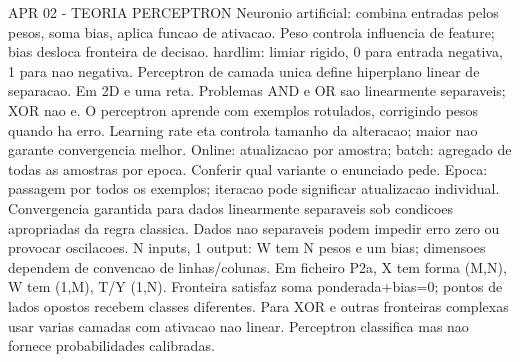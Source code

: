 APR 02 - TEORIA PERCEPTRON
Neuronio artificial: combina entradas pelos pesos, soma bias, aplica funcao de ativacao.
Peso controla influencia de feature; bias desloca fronteira de decisao.
hardlim: limiar rigido, 0 para entrada negativa, 1 para nao negativa.
Perceptron de camada unica define hiperplano linear de separacao. Em 2D e uma reta.
Problemas AND e OR sao linearmente separaveis; XOR nao e.
O perceptron aprende com exemplos rotulados, corrigindo pesos quando ha erro.
Learning rate eta controla tamanho da alteracao; maior nao garante convergencia melhor.
Online: atualizacao por amostra; batch: agregado de todas as amostras por epoca. Conferir qual variante o enunciado pede.
Epoca: passagem por todos os exemplos; iteracao pode significar atualizacao individual.
Convergencia garantida para dados linearmente separaveis sob condicoes apropriadas da regra classica.
Dados nao separaveis podem impedir erro zero ou provocar oscilacoes.
N inputs, 1 output: W tem N pesos e um bias; dimensoes dependem de convencao de linhas/colunas.
Em ficheiro P2a, X tem forma (M,N), W tem (1,M), T/Y (1,N).
Fronteira satisfaz soma ponderada+bias=0; pontos de lados opostos recebem classes diferentes.
Para XOR e outras fronteiras complexas usar varias camadas com ativacao nao linear.
Perceptron classifica mas nao fornece probabilidades calibradas.